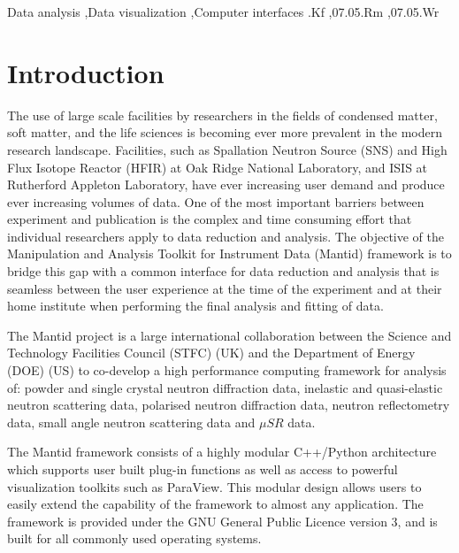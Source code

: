 \documentclass[1p]{elsarticle}
\begin{document}
\begin{frontmatter}
\begin{keyword}
Data analysis \sep Data visualization \sep Computer interfaces
.Kf 	%
\sep 07.05.Rm 	%
\sep 07.05.Wr 	%
\end{keyword}
\end{frontmatter}

\section{Introduction}
\label{Introduction}


The use of large scale facilities by researchers in the fields of condensed matter, soft matter, and the life sciences is becoming ever more prevalent in the modern research landscape. Facilities, such as Spallation Neutron Source (SNS) and High Flux Isotope Reactor (HFIR) at Oak Ridge National Laboratory, and ISIS at Rutherford Appleton Laboratory, have ever increasing user demand and produce ever increasing volumes of data. One of the most important barriers between experiment and publication is the complex and time consuming effort that individual researchers apply to data reduction and analysis.
The objective of the Manipulation and Analysis Toolkit for Instrument Data\cite{mantiddoi} (Mantid) framework is to bridge this gap with a common interface for data reduction and analysis that is seamless between the user experience at the time of the experiment and at their home institute when performing the final analysis and fitting of data.

The Mantid project is a large international collaboration between the Science and Technology Facilities Council (STFC) (UK) and the Department of Energy (DOE) (US) to co-develop a high performance computing framework for analysis of: powder and single crystal neutron diffraction data, inelastic and quasi-elastic neutron scattering data, polarised neutron diffraction data, neutron reflectometry data, small angle neutron scattering data and $\mu SR$ data. 

The Mantid framework consists of a highly modular C++/Python architecture which supports user built plug-in functions as well as access to powerful visualization toolkits such as ParaView\cite{paraview}. This modular design allows users to easily extend the capability of the framework to almost any application. The framework is provided under the GNU General Public Licence version 3\cite{gpl}, and is built for all commonly used operating systems.
\end{document}
